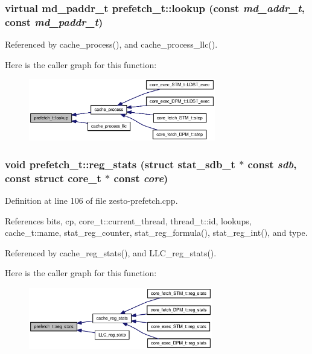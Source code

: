\subsubsection[{lookup}]{\setlength{\rightskip}{0pt plus 5cm}virtual {\bf md\_\-paddr\_\-t} prefetch\_\-t::lookup (const  {\em md\_\-addr\_\-t}, \/  const  {\em md\_\-paddr\_\-t})\hspace{0.3cm}{\tt  [pure virtual]}}\label{classprefetch__t_f2a748bc302cee9529644cd4efca07e1}




Referenced by cache\_\-process(), and cache\_\-process\_\-llc().

Here is the caller graph for this function:\nopagebreak
\begin{figure}[H]
\begin{center}
\leavevmode
\includegraphics[width=231pt]{classprefetch__t_f2a748bc302cee9529644cd4efca07e1_icgraph}
\end{center}
\end{figure}
\subsubsection[{reg\_\-stats}]{\setlength{\rightskip}{0pt plus 5cm}void prefetch\_\-t::reg\_\-stats (struct {\bf stat\_\-sdb\_\-t} $\ast$ const {\em sdb}, \/  const struct {\bf core\_\-t} $\ast$ const {\em core})\hspace{0.3cm}{\tt  [virtual]}}\label{classprefetch__t_485ee44aa3f5af50d2cfb05f6485db35}




Definition at line 106 of file zesto-prefetch.cpp.

References bits, cp, core\_\-t::current\_\-thread, thread\_\-t::id, lookups, cache\_\-t::name, stat\_\-reg\_\-counter, stat\_\-reg\_\-formula(), stat\_\-reg\_\-int(), and type.

Referenced by cache\_\-reg\_\-stats(), and LLC\_\-reg\_\-stats().

Here is the caller graph for this function:\nopagebreak
\begin{figure}[H]
\begin{center}
\leavevmode
\includegraphics[width=227pt]{classprefetch__t_485ee44aa3f5af50d2cfb05f6485db35_icgraph}
\end{center}
\end{figure}


